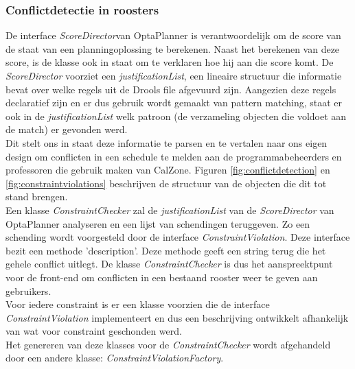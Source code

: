 \subsubsection{Conflictdetectie in roosters}
\label{subsubsec:conflicts}
De interface \emph{ScoreDirector}\footnotemark[\value{footnote}] van OptaPlanner is verantwoordelijk om de score van de staat van een planningoplossing te berekenen.
Naast het berekenen van deze score, is de klasse ook in staat om te verklaren hoe hij aan die score komt. 
De \emph{ScoreDirector} voorziet een \emph{justificationList}, een lineaire structuur die informatie bevat over welke regels uit de Drools file afgevuurd zijn.
Aangezien deze regels declaratief zijn en er dus gebruik wordt gemaakt van pattern matching, staat er ook in de \emph{justificationList} welk patroon (de verzameling objecten die voldoet aan de match) er gevonden werd.\\

Dit stelt ons in staat deze informatie te parsen en te vertalen naar ons eigen design om conflicten in een schedule te melden aan de programmabeheerders en professoren die gebruik maken van CalZone.
Figuren \ref{fig:conflictdetection} en \ref{fig:constraintviolations} beschrijven de structuur van de objecten die dit tot stand brengen.\\

Een klasse \emph{ConstraintChecker} zal de \emph{justificationList} van de \emph{ScoreDirector} van OptaPlanner analyseren en een lijst van schendingen teruggeven.
Zo een schending wordt voorgesteld door de interface \emph{ConstraintViolation}.
Deze interface bezit een methode 'description'.
Deze methode geeft een string terug die het gehele conflict uitlegt.
De klasse \emph{ConstraintChecker} is dus het aanspreektpunt voor de front-end om conflicten in een bestaand rooster weer te geven aan gebruikers.\\

Voor iedere constraint is er een klasse voorzien die de interface \emph{ConstraintViolation} implementeert en dus een beschrijving ontwikkelt afhankelijk van wat voor constraint geschonden werd.\\

Het genereren van deze klasses voor de \emph{ConstraintChecker} wordt afgehandeld door een andere klasse: \emph{ConstraintViolationFactory}.

